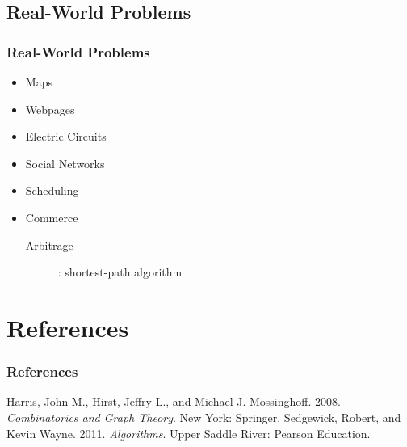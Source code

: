 \documentclass{beamer}
\theoremstyle{Plain}\newtheorem{kt}{Kuratowski's Theorem}
\theoremstyle{Definition}\newtheorem{te}{Tr\'emaux Exploration}
\theoremstyle{Definition}\newtheorem{dfs}{Depth-First Search}
\begin{document}
\subsection{Real-World Problems}
\begin{frame}
  \frametitle{Real-World Problems}
  \begin{itemize}
    \item Maps
    \item Webpages
    \item Electric Circuits
    \item Social Networks
    \item Scheduling
    \item Commerce
      \begin{description}
        \item[Arbitrage]: shortest-path algorithm
      \end{description}
  \end{itemize}
\end{frame}

\section{References}
\begin{frame}
  \frametitle{References}
  \begin{thebibliography}{99}
     Harris, John M., Hirst, Jeffry L., and Michael J.
      Mossinghoff. 2008. \emph{Combinatorics and Graph Theory}. New
      York: Springer.
     Sedgewick, Robert, and Kevin Wayne. 2011.
      \emph{Algorithms}. Upper Saddle River: Pearson Education.
  \end{thebibliography}
\end{frame}
\end{document}
